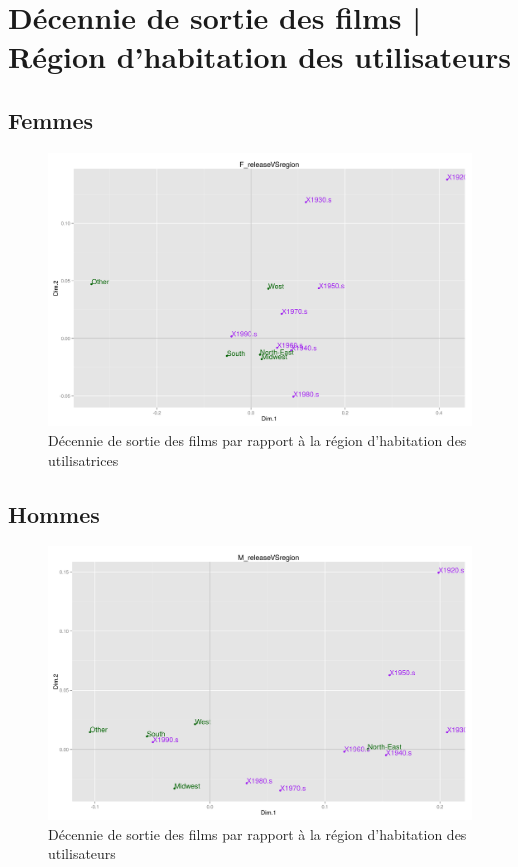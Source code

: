 \section{Décennie de sortie des films | Région d'habitation des utilisateurs}
\subsection{Femmes}
\begin{figure}[htd]
\centering
\includegraphics[scale=0.4]{./images/F_releaseVSregion}
\caption{Décennie de sortie des films par rapport à la région d'habitation des utilisatrices}
\end{figure}

\subsection{Hommes}
\begin{figure}[htd]
\centering
\includegraphics[scale=0.4]{./images/M_releaseVSregion}
\caption{Décennie de sortie des films par rapport à la région d'habitation des utilisateurs}
\end{figure}